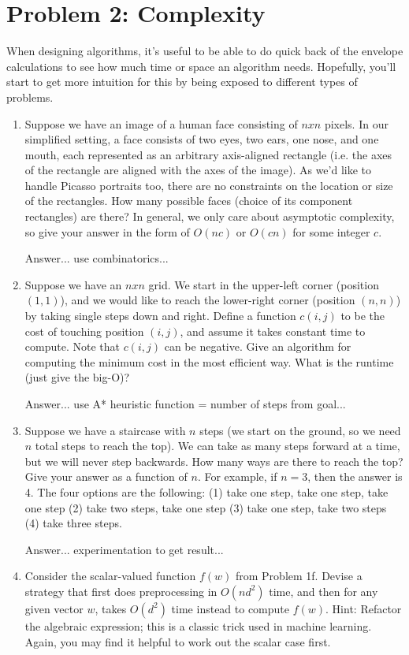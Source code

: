 \documentclass[10pt]{article}
\begin{document}
\section*{\normalsize Problem 2: Complexity}

When designing algorithms, it's useful to be able to do quick back of the envelope calculations to see how much time or space an algorithm needs. Hopefully, you'll start to get more intuition for this by being exposed to different types of problems.

\begin{enumerate}[label=(\alph*)]

  \item Suppose we have an image of a human face consisting of $nxn$ pixels. In our simplified setting, a face consists of two eyes, two ears, one nose, and one mouth, each represented as an arbitrary axis-aligned rectangle (i.e. the axes of the rectangle are aligned with the axes of the image). As we'd like to handle Picasso portraits too, there are no constraints on the location or size of the rectangles. How many possible faces (choice of its component rectangles) are there? In general, we only care about asymptotic complexity, so give your answer in the form of $O(nc)$ or $O(cn)$ for some integer $c$.
  
  Answer... use combinatorics...
  
  \item Suppose we have an $nxn$ grid. We start in the upper-left corner (position $(1,1)$), and we would like to reach the lower-right corner (position $(n,n)$) by taking single steps down and right. Define a function $c(i,j)$ to be the cost of touching position $(i,j)$, and assume it takes constant time to compute. Note that $c(i,j)$ can be negative. Give an algorithm for computing the minimum cost in the most efficient way. What is the runtime (just give the big-O)?
  
  Answer... use A* heuristic function = number of steps from goal...
  
  \item Suppose we have a staircase with $n$ steps (we start on the ground, so we need $n$ total steps to reach the top). We can take as many steps forward at a time, but we will never step backwards. How many ways are there to reach the top? Give your answer as a function of $n$. For example, if $n=3$, then the answer is 4. The four options are the following: (1) take one step, take one step, take one step (2) take two steps, take one step (3) take one step, take two steps (4) take three steps.
  
  Answer... experimentation to get result...
  
  \item Consider the scalar-valued function $f(w)$ from Problem 1f. Devise a strategy that first does preprocessing in $O(nd^2)$ time, and then for any given vector $w$, takes $O(d^2)$ time instead to compute $f(w)$.
Hint: Refactor the algebraic expression; this is a classic trick used in machine learning. Again, you may find it helpful to work out the scalar case first.

\end{enumerate}
\end{document}
